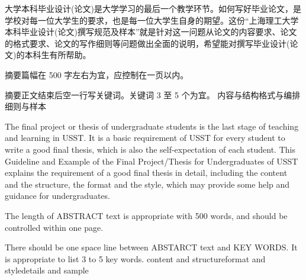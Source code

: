 \abstractcn 
\par 大学本科毕业设计(论文)是大学学习的最后一个教学环节。如何写好毕业论文，是学校对每一位大学生的要求，也是每一位大学生自身的期望。这份“上海理工大学本科毕业设计(论文)撰写规范及样本”就是针对这一问题从论文的内容要求、论文的格式要求、论文的写作细则等问题做出全面的说明，希望能对撰写毕业设计(论文)的本科生有所帮助。
\par 摘要篇幅在 500 字左右为宜，应控制在一页以内。
\par 摘要正文结束后空一行写关键词。关键词 3 至 5 个为宜。
\keywordscn 内容与结构\quad 格式与编排\quad 细则与样本
\abstracten
\par The final project or thesis of undergraduate students is the last stage of teaching and learning in USST. It is a basic requirement of USST for every student to write a good final thesis, which is also the self-expectation of each student. This Guideline and Example of the Final Project/Thesis for Undergraduates of USST explains the requirement of a good final thesis in detail, including the content and the structure, the format and the style, which
may provide some help and guidance for undergraduates.
\par The length of ABSTRACT text is appropriate with 500 words, and should be controlled within one page.
\par There should be one space line between ABSTARCT text and KEY WORDS. It is
appropriate to list 3 to 5 key words.
\keywordsen content and structure\quad format and style\quad details and sample
